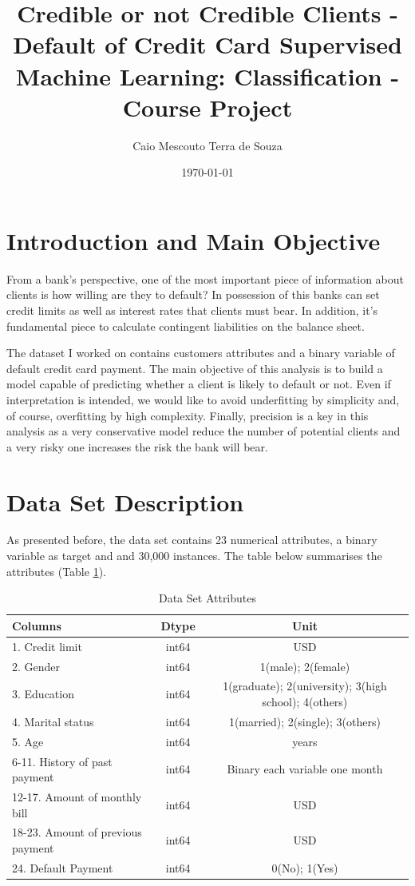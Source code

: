 \documentclass[11pt, a4]{article}
\title{Credible or not Credible Clients - Default of Credit Card
	Supervised Machine Learning: Classification - Course Project}
\author{Caio Mescouto Terra de Souza}
\date{\today}
\begin{document}
\maketitle

\section*{Introduction and Main Objective}

From a bank's perspective, one of the most important piece of information about clients is how willing are they to default? In possession of this banks can set credit limits as well as interest rates that clients must bear. In addition, it's fundamental piece to calculate contingent liabilities on the balance sheet. 

The dataset \cite{credit} I worked on contains customers attributes and a binary variable of default credit card payment. The main objective of this analysis is to build a model capable of predicting whether a client is likely to default or not. Even if interpretation is intended, we would like to avoid underfitting by simplicity and, of course, overfitting by high complexity. Finally, precision is a key in this analysis as a very conservative model reduce the number of potential clients and a very risky one increases the risk the bank will bear. 

\section*{Data Set Description}

As presented before, the data set contains 23 numerical attributes, a binary variable as target and and 30,000 instances. The table below summarises the attributes (Table  \ref{table:1}).
 

\begin{table}[h!]
\centering
\begin{tabular}{l c c}
\toprule
\textbf{Columns} & \textbf{Dtype} & \textbf{Unit} \\
\midrule
1. Credit limit & int64 & USD\\
2. Gender & int64 & 1(male); 2(female)\\
3. Education & int64 & 1(graduate); 2(university); 3(high school); 4(others)\\
4. Marital status & int64 & 1(married); 2(single); 3(others) \\ 
5. Age & int64 & years \\
6-11. History of past payment & int64  & Binary each variable one month\\
12-17. Amount of monthly bill & int64 & USD\\
18-23. Amount of previous payment & int64 & USD \\
24. Default Payment & int64 & 0(No); 1(Yes)\\
\bottomrule
\end{tabular}
\caption{Data Set Attributes}
\label{table:1}
\end{table}
\end{document}
